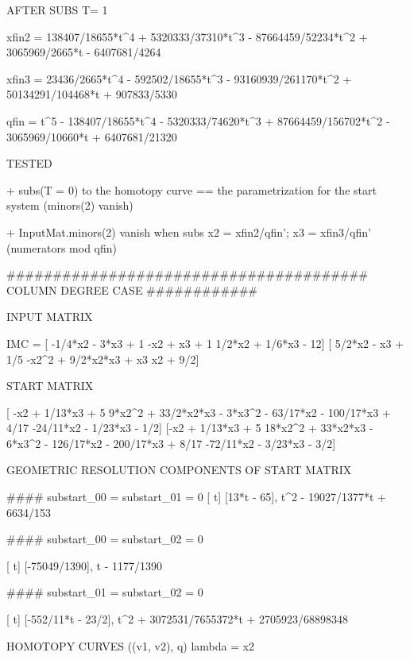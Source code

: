 AFTER SUBS T= 1

xfin2 = 138407/18655*t^4 + 5320333/37310*t^3 - 87664459/52234*t^2 + 3065969/2665*t - 6407681/4264

xfin3 = 23436/2665*t^4 - 592502/18655*t^3 - 93160939/261170*t^2 + 50134291/104468*t + 907833/5330

qfin = t^5 - 138407/18655*t^4 - 5320333/74620*t^3 + 87664459/156702*t^2 - 3065969/10660*t + 6407681/21320


TESTED

+ subs(T = 0) to the homotopy curve == the parametrization for the start system (minors(2) vanish)

+ InputMat.minors(2) vanish when subs x2 = xfin2/qfin'; x3 = xfin3/qfin' (numerators mod qfin) 



#######################################  COLUMN DEGREE CASE ############

INPUT MATRIX

IMC = [    -1/4*x2 - 3*x3 + 1           -x2 + x3 + 1         1/2*x2 + 1/6*x3 - 12]
      [     5/2*x2 - x3 + 1/5      -x2^2 + 9/2*x2*x3 + x3                x2 + 9/2]


START MATRIX

[ -x2 + 1/13*x3 + 5       9*x2^2 + 33/2*x2*x3 - 3*x3^2 - 63/17*x2 - 100/17*x3 + 4/17                                  -24/11*x2 - 1/23*x3 - 1/2]
[-x2 + 1/13*x3 + 5        18*x2^2 + 33*x2*x3 - 6*x3^2 - 126/17*x2 - 200/17*x3 + 8/17                                  -72/11*x2 - 3/23*x3 - 3/2]



GEOMETRIC RESOLUTION COMPONENTS OF START MATRIX

 #### substart_00 = substart_01 = 0 
[        t]                               
[13*t - 65], t^2 - 19027/1377*t + 6634/153

#### substart_00 = substart_02 = 0

[          t]               
[-75049/1390], t - 1177/1390

#### substart_01 = substart_02 = 0

[               t]                                            
[-552/11*t - 23/2], t^2 + 3072531/7655372*t + 2705923/68898348




HOMOTOPY CURVES ((v1, v2), q) lambda = x2

